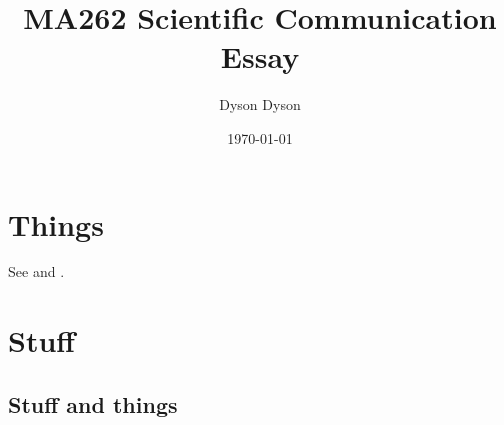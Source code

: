 \documentclass[a4paper]{article}
\title{MA262 Scientific Communication Essay}
\author{Dyson Dyson}
\date{\today}
\begin{document}
\maketitle

\setlength{\parindent}{0em}
\setlength{\parskip}{1em}

\tableofcontents
\newpage


\section{Things}

See \parencite[pp.~7--10]{barendregt-1981-lambda-calculus} and \citeauthor{church-1965-calculi-lambda-conversion}.

\section{Stuff}

\subsection{Stuff and things}

\newpage
\nocite{*} %
\printbibliography[]
\end{document}

